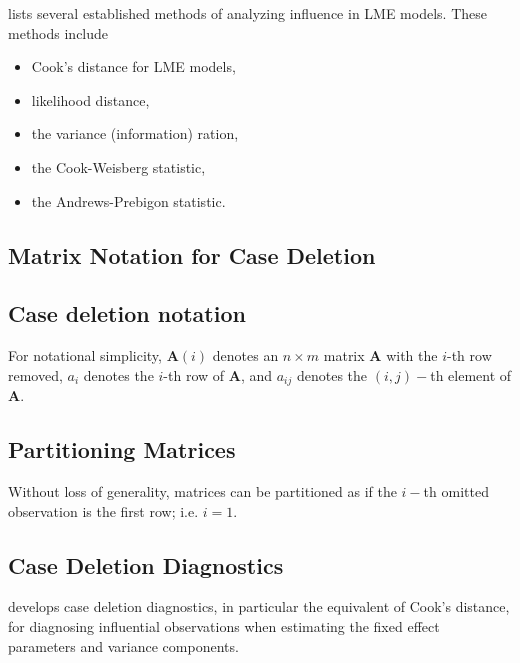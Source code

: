 \documentclass[12pt, a4paper]{report}
\begin{document}
\citet{Zewotir} lists several established methods of analyzing influence in LME models. These methods include \begin{itemize}
	\item Cook's distance for LME models,
	\item {} likelihood distance,
	\item the variance (information) ration,
	\item the  Cook-Weisberg statistic,
	\item the  Andrews-Prebigon statistic.
\end{itemize}







\subsection{Matrix Notation for Case Deletion} %

\subsection{Case deletion notation} %

For notational simplicity, $\boldsymbol{A}(i)$ denotes an $n \times m$ matrix $\boldsymbol{A}$ with the $i$-th row
removed, $a_i$ denotes the $i$-th row of $\boldsymbol{A}$, and $a_{ij}$ denotes the $(i, j)-$th element of $\boldsymbol{A}$.

\subsection{Partitioning Matrices} %
Without loss of generality, matrices can be partitioned as if the $i-$th omitted observation is the first row; i.e. $i=1$.



\subsection{Case Deletion Diagnostics} %

\citet{CPJ} develops  case deletion diagnostics, in particular the equivalent of  Cook's distance, for diagnosing influential observations when estimating the fixed effect parameters and variance components.
\end{document}
